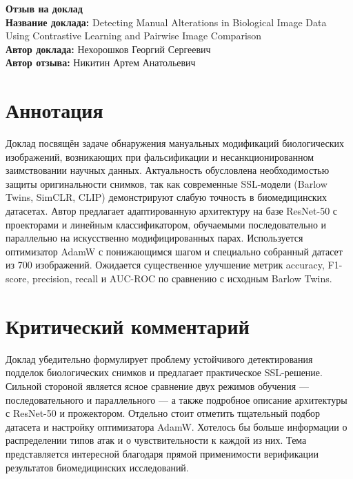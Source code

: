 \documentclass[11pt]{article}
\begin{document}
\begin{center}
    {\Large \textbf{Отзыв на доклад}}\\[1em]
    {\large \textbf{Название доклада:} Detecting Manual Alterations in Biological Image Data Using Contrastive Learning and Pairwise Image Comparison}\\[0.5em]
    {\large \textbf{Автор доклада:} Нехорошков Георгий Сергеевич}\\[0.5em]
    {\large \textbf{Автор отзыва:} Никитин Артем Анатольевич}\\[2em]
\end{center}

\section*{Аннотация}
Доклад посвящён задаче обнаружения мануальных модификаций биологических изображений, возникающих при фальсификации 
и несанкционированном заимствовании научных данных. Актуальность обусловлена необходимостью защиты оригинальности снимков, 
так как современные SSL-модели (Barlow Twins, SimCLR, CLIP) демонстрируют слабую точность в биомедицинских датасетах. 
Автор предлагает адаптированную архитектуру на базе ResNet-50 с проекторами и линейным классификатором, обучаемыми 
последовательно и параллельно на искусственно модифицированных парах. Используется оптимизатор AdamW с понижающимся 
шагом и специально собранный датасет из 700 изображений. Ожидается существенное улучшение метрик accuracy, F1-score, 
precision, recall и AUC-ROC по сравнению с исходным Barlow Twins.

\section*{Критический комментарий}
Доклад убедительно формулирует проблему устойчивого детектирования подделок биологических снимков и предлагает 
практическое SSL-решение. Сильной стороной является ясное сравнение двух режимов обучения — последовательного и 
параллельного — а также подробное описание архитектуры с ResNet-50 и прожектором. Отдельно стоит отметить тщательный 
подбор датасета и настройку оптимизатора AdamW. Хотелось бы больше информации о распределении типов атак и о чувствительности 
к каждой из них. Тема представляется интересной благодаря прямой применимости верификации результатов биомедицинских 
исследований.
\end{document}
